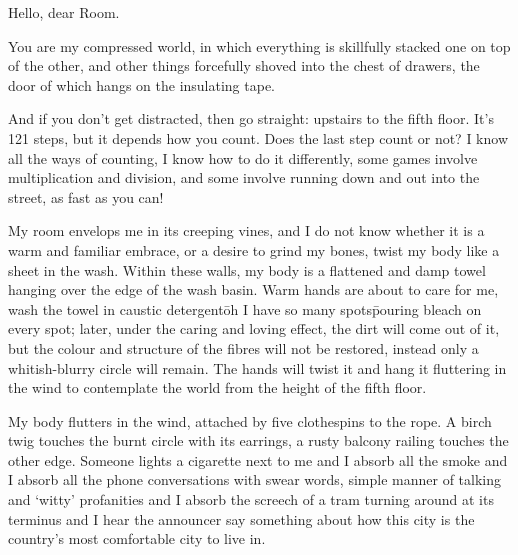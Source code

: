 Hello, dear Room.

You are my compressed world, in which everything is skillfully stacked
one on top of the other, and other things forcefully shoved into the
chest of drawers, the door of which hangs on the insulating tape.

And if you don't get distracted, then go straight: upstairs to the
fifth floor. It’s 121 steps, but it depends how you count. Does the
last step count or not? I know all the ways of counting, I know how to
do it differently, some games involve multiplication and division, and
some involve running down and out into the street, as fast as you can!

My room envelops me in its creeping vines, and I do not know whether
it is a warm and familiar embrace, or a desire to grind my bones,
twist my body like a sheet in the wash. Within these walls, my body is
a flattened and damp towel hanging over the edge of the wash
basin. Warm hands are about to care for me, wash the towel in caustic
detergent\=oh I have so many spots\=pouring bleach on every spot;
later, under the caring and loving effect, the dirt will come out of
it, but the colour and structure of the fibres will not be restored,
instead only a whitish-blurry circle will remain. The hands will twist
it and hang it fluttering in the wind to contemplate the world from
the height of the fifth floor.

My body flutters in the wind, attached by five clothespins to the
rope. A birch twig touches the burnt circle with its earrings, a rusty
balcony railing touches the other edge. Someone lights a cigarette
next to me and I absorb all the smoke and I absorb all the phone
conversations with swear words, simple manner of talking and `witty'
profanities and I absorb the screech of a tram turning around at its
terminus and I hear the announcer say something about how this city is
the country’s most comfortable city to live in.
